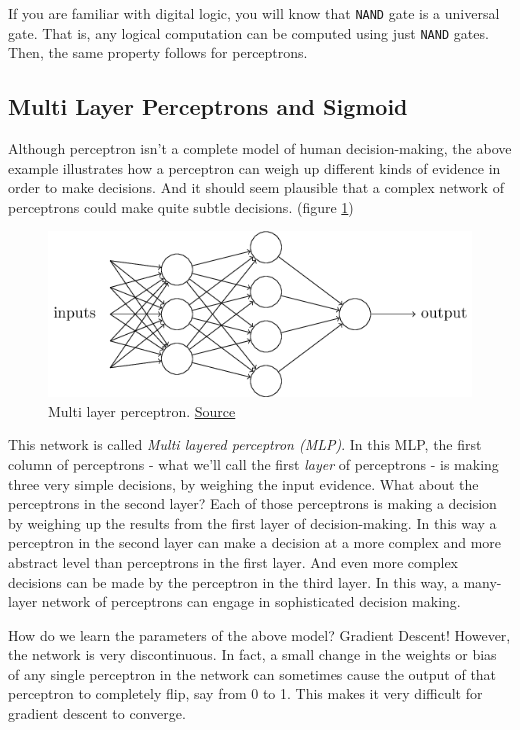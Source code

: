\documentclass[a4paper]{tufte-handout}
\begin{document}
If you are familiar with digital logic, you will know that \texttt{NAND}
gate is a universal gate. That is, any logical computation can be
computed using just \texttt{NAND} gates. Then, the same property follows
for perceptrons.

\subsection{Multi Layer Perceptrons and Sigmoid}
\label{multi-layer-perceptrons-and-sigmoid}

Although perceptron isn't a complete model of human decision-making, the
above example illustrates how a perceptron can weigh up different kinds
of evidence in order to make decisions. And it should seem plausible
that a complex network of perceptrons could make quite subtle decisions. (figure \ref{fig:mlp})

\begin{figure}
  \includegraphics[width=\linewidth]{tikz1}
  \caption{Multi layer perceptron.
\href{http://neuralnetworksanddeeplearning.com/chap1.html}{Source} }
\label{fig:mlp}
\end{figure}

This network is called \emph{Multi layered perceptron (MLP)}. In this
MLP, the first column of perceptrons - what we'll call the first
\emph{layer} of perceptrons - is making three very simple decisions, by
weighing the input evidence. What about the perceptrons in the second
layer? Each of those perceptrons is making a decision by weighing up the
results from the first layer of decision-making. In this way a
perceptron in the second layer can make a decision at a more complex and
more abstract level than perceptrons in the first layer. And even more
complex decisions can be made by the perceptron in the third layer. In
this way, a many-layer network of perceptrons can engage in
sophisticated decision making.

How do we learn the parameters of the above model? Gradient Descent!
However, the network is very discontinuous. In fact, a small change in
the weights or bias of any single perceptron in the network can
sometimes cause the output of that perceptron to completely flip, say
from 0 to 1. This makes it very difficult for gradient descent to
converge.
\end{document}

